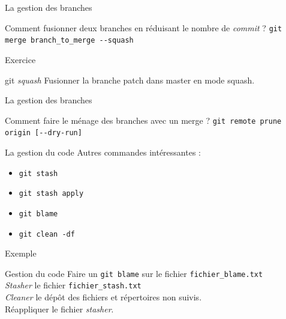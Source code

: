 \documentclass[11pt]{beamer}
\begin{document}
\begin{frame}[fragile]{La gestion des branches}
	\begin{block}{Comment fusionner deux branches en réduisant le nombre de \textit{commit} ?}
		\verb|git merge branch_to_merge --squash|
	\end{block}
\end{frame}

\begin{frame}[fragile]{Exercice}
	\begin{block}{git \textit{squash}}
		Fusionner la branche patch dans master en mode squash.
	\end{block}
\end{frame}

\begin{frame}[fragile]{La gestion des branches}
	\begin{block}{Comment faire le ménage des branches avec un merge ?}
		\verb|git remote prune origin [--dry-run]|
	\end{block}
\end{frame}

\begin{frame}[fragile]{La gestion du code}
	Autres commandes intéressantes :
	\begin{itemize}
		\item \verb|git stash|
		\item \verb|git stash apply|
		\item \verb|git blame|
		\item \verb|git clean -df|
	\end{itemize}
\end{frame}

\begin{frame}[fragile]{Exemple}
	\begin{block}{Gestion du code}
		Faire un \verb|git blame| sur le fichier \verb|fichier_blame.txt|\\
		\textit{Stasher} le fichier \verb|fichier_stash.txt|\\
		\textit{Cleaner} le dépôt des fichiers et répertoires non suivis. \\
		Réappliquer le fichier \textit{stasher}.
	\end{block}
\end{frame}
\end{document}
